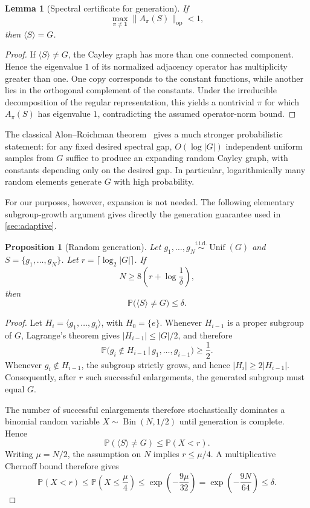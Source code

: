 \documentclass[11pt]{article}
\theoremstyle{plain}
\newtheorem{proposition}[theorem]{Proposition}
\newtheorem{lemma}[theorem]{Lemma}
\theoremstyle{definition}
\theoremstyle{remark}
\begin{document}
\begin{lemma}[Spectral certificate for generation]
\label{lem:spectral_generation}
If
\[
\max_{\pi\neq\mathbf 1}
\|A_\pi(S)\|_{\mathrm{op}}<1,
\]
then \(\langle S\rangle=G\).
\end{lemma}

\begin{proof}
If \(\langle S\rangle\neq G\), the Cayley graph has more than one connected
component. Hence the eigenvalue \(1\) of its normalized adjacency operator has
multiplicity greater than one. One copy corresponds to the constant functions,
while another lies in the orthogonal complement of the constants. Under the
irreducible decomposition of the regular representation, this yields a
nontrivial \(\pi\) for which \(A_\pi(S)\) has eigenvalue \(1\), contradicting
the assumed operator-norm bound.
\end{proof}

The classical Alon--Roichman theorem~\citep{alon1994random} gives a much
stronger probabilistic statement: for any fixed desired spectral gap,
\(O(\log |G|)\) independent uniform samples from \(G\) suffice to produce an
expanding random Cayley graph, with constants depending only on the desired
gap. In particular, logarithmically many random elements generate \(G\) with
high probability.

For our purposes, however, expansion is not needed. The following elementary
subgroup-growth argument gives directly the generation guarantee used in
\cref{sec:adaptive}.

\begin{proposition}[Random generation]
\label{prop:random_generators}
Let \(g_1,\ldots,g_N\overset{\mathrm{i.i.d.}}{\sim}\operatorname{Unif}(G)\)
and \(S=\{g_1,\ldots,g_N\}\). Let
\(r=\lceil\log_2|G|\rceil\). If
\[
N\ge
8\left(
r+\log\frac{1}{\delta}
\right),
\]
then
\[
\mathbb P\bigl(\langle S\rangle\neq G\bigr)\le\delta.
\]
\end{proposition}

\begin{proof}
Let \(H_i=\langle g_1,\ldots,g_i\rangle\), with \(H_0=\{e\}\). Whenever
\(H_{i-1}\) is a proper subgroup of \(G\), Lagrange's theorem gives
\(|H_{i-1}|\le |G|/2\), and therefore
\[
\mathbb P
\bigl(
g_i\notin H_{i-1}
\,\big|\,
g_1,\ldots,g_{i-1}
\bigr)
\ge\frac12.
\]
Whenever \(g_i\notin H_{i-1}\), the subgroup strictly grows, and hence
\(|H_i|\ge2|H_{i-1}|\). Consequently, after \(r\) such successful
enlargements, the generated subgroup must equal \(G\).

The number of successful enlargements therefore stochastically dominates a
binomial random variable \(X\sim\operatorname{Bin}(N,1/2)\) until generation
is complete. Hence
\[
\mathbb P(\langle S\rangle\neq G)
\le
\mathbb P(X<r).
\]
Writing \(\mu=N/2\), the assumption on \(N\) implies \(r\le\mu/4\). A
multiplicative Chernoff bound therefore gives
\[
\mathbb P(X<r)
\le
\mathbb P\left(X\le\frac{\mu}{4}\right)
\le
\exp\left(-\frac{9\mu}{32}\right)
=
\exp\left(-\frac{9N}{64}\right)
\le\delta.
\]
\end{proof}
\end{document}

